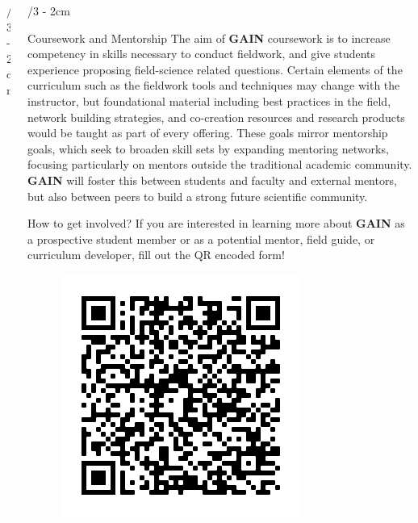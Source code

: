 \documentclass[landscape]{uwposter}
\begin{document}
\begin{frame}
\begin{columns}[onlytextwidth]
\begin{column}{\textwidth/3 - 2cm}
  \end{column}


\begin{column}{\textwidth/3 - 2cm}
    \begin{block}{Coursework and Mentorship}
        The aim of  \textbf{\alert{GAIN}} coursework is to increase competency in skills necessary to conduct fieldwork, and give students experience proposing field-science related questions. Certain elements of the curriculum such as the fieldwork tools and techniques may change with the instructor, but foundational material including best practices in the field, network building strategies, and co-creation resources and research products would be taught as part of every offering. These goals mirror mentorship goals, which seek to broaden skill sets by expanding mentoring networks, focusing particularly on mentors outside the traditional academic community. \textbf{\alert{GAIN}}  will foster this between students and faculty and external mentors, but also between peers to build a strong future scientific community. 

    \end{block}



    \begin{alertblock}{How to get involved?}
        If you are interested in learning more about \textbf{\alert{GAIN}} as a prospective student member or as a potential mentor, field guide, or curriculum developer, fill out the QR encoded form!
        \begin{figure}
        \includegraphics[width=.4\linewidth]{uwposter-images/frame.png}
        \label{fig:qrcode}
        \end{figure}
        
    \end{alertblock}

\end{column}


\end{columns}



\end{frame}
\end{document}
